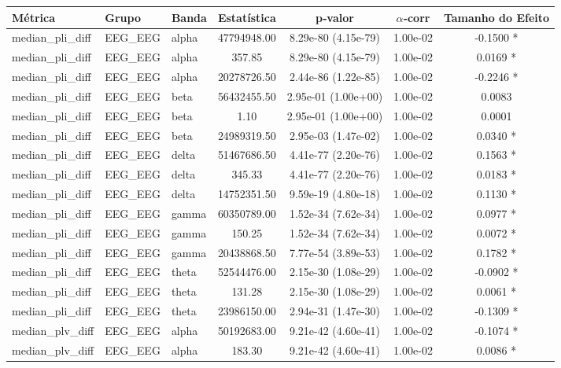 \begin{tabular}{l l l c c c c}
    \toprule
    Métrica & Grupo & Banda & Estatística & p‑valor & $\alpha$‑corr & Tamanho do Efeito \\
    \midrule
    median\_pli\_diff & EEG\_EEG & alpha & 47794948.00 & 8.29e-80 (4.15e-79) & 1.00e-02 & -0.1500 * \\
    median\_pli\_diff & EEG\_EEG & alpha & 357.85 & 8.29e-80 (4.15e-79) & 1.00e-02 & 0.0169 * \\
    median\_pli\_diff & EEG\_EEG & alpha & 20278726.50 & 2.44e-86 (1.22e-85) & 1.00e-02 & -0.2246 * \\
    median\_pli\_diff & EEG\_EEG & beta & 56432455.50 & 2.95e-01 (1.00e+00) & 1.00e-02 & 0.0083  \\
    median\_pli\_diff & EEG\_EEG & beta & 1.10 & 2.95e-01 (1.00e+00) & 1.00e-02 & 0.0001  \\
    median\_pli\_diff & EEG\_EEG & beta & 24989319.50 & 2.95e-03 (1.47e-02) & 1.00e-02 & 0.0340 * \\
    median\_pli\_diff & EEG\_EEG & delta & 51467686.50 & 4.41e-77 (2.20e-76) & 1.00e-02 & 0.1563 * \\
    median\_pli\_diff & EEG\_EEG & delta & 345.33 & 4.41e-77 (2.20e-76) & 1.00e-02 & 0.0183 * \\
    median\_pli\_diff & EEG\_EEG & delta & 14752351.50 & 9.59e-19 (4.80e-18) & 1.00e-02 & 0.1130 * \\
    median\_pli\_diff & EEG\_EEG & gamma & 60350789.00 & 1.52e-34 (7.62e-34) & 1.00e-02 & 0.0977 * \\
    median\_pli\_diff & EEG\_EEG & gamma & 150.25 & 1.52e-34 (7.62e-34) & 1.00e-02 & 0.0072 * \\
    median\_pli\_diff & EEG\_EEG & gamma & 20438868.50 & 7.77e-54 (3.89e-53) & 1.00e-02 & 0.1782 * \\
    median\_pli\_diff & EEG\_EEG & theta & 52544476.00 & 2.15e-30 (1.08e-29) & 1.00e-02 & -0.0902 * \\
    median\_pli\_diff & EEG\_EEG & theta & 131.28 & 2.15e-30 (1.08e-29) & 1.00e-02 & 0.0061 * \\
    median\_pli\_diff & EEG\_EEG & theta & 23986150.00 & 2.94e-31 (1.47e-30) & 1.00e-02 & -0.1309 * \\
    median\_plv\_diff & EEG\_EEG & alpha & 50192683.00 & 9.21e-42 (4.60e-41) & 1.00e-02 & -0.1074 * \\
    median\_plv\_diff & EEG\_EEG & alpha & 183.30 & 9.21e-42 (4.60e-41) & 1.00e-02 & 0.0086 * \\

\end{tabular}
